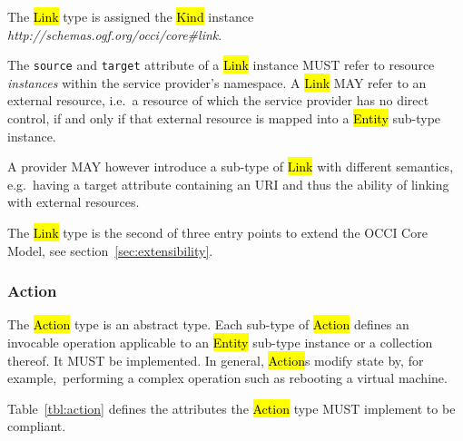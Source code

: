 \documentclass[10pt,a4paper]{article}
\begin{document}
The \hl{Link} type is assigned the \hl{Kind} instance
\textit{http://schemas.ogf.org/occi/core\#link}.


The {\tt source} and {\tt target} attribute of a \hl{Link} instance
MUST refer to resource {\em instances} within the service provider's
namespace. A \hl{Link} MAY refer to an external resource, i.e.~a
resource of which the service provider has no direct control, if and
only if that external resource is mapped into a \hl{Entity} sub-type
instance.

A provider MAY however introduce a sub-type of \hl{Link} with
different semantics, e.g.~having a target attribute containing an URI
and thus the ability of linking with external resources.

The \hl{Link} type is the second of three entry points to extend the
OCCI Core Model, see section~\ref{sec:extensibility}.

\subsubsection{Action}
The \hl{Action} type is an abstract type. Each sub-type of \hl{Action}
defines an invocable operation applicable to an \hl{Entity} sub-type
instance or a collection thereof. It MUST be implemented. In general,
\hl{Action}s modify state by, for example,~performing a complex
operation such as rebooting a virtual machine.

Table~\ref{tbl:action} defines the attributes the \hl{Action} type
MUST implement to be compliant.

\end{document}
